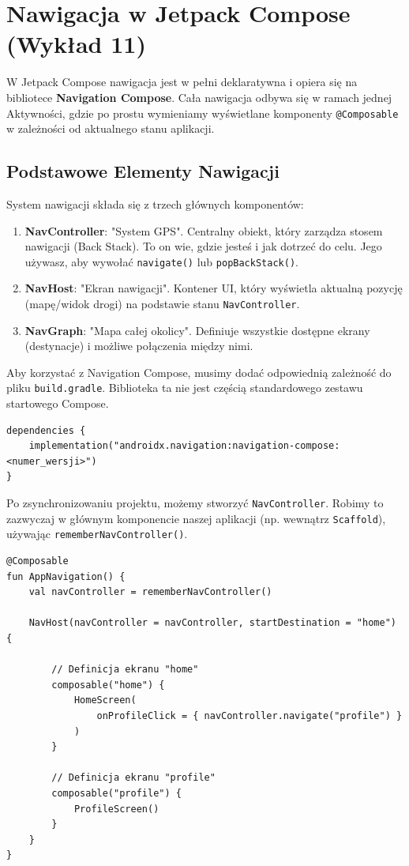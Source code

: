 \chapter{Nawigacja w Jetpack Compose (Wykład 11)}

W Jetpack Compose nawigacja jest w pełni deklaratywna i opiera się na bibliotece \textbf{Navigation Compose}. Cała nawigacja odbywa się w ramach jednej Aktywności, gdzie po prostu wymieniamy wyświetlane komponenty \texttt{@Composable} w zależności od aktualnego stanu aplikacji.

\section{Podstawowe Elementy Nawigacji}

System nawigacji składa się z trzech głównych komponentów:

\begin{enumerate}
    \item \textbf{NavController}: "System GPS". Centralny obiekt, który zarządza stosem nawigacji (Back Stack). To on wie, gdzie jesteś i jak dotrzeć do celu. Jego używasz, aby wywołać \texttt{navigate()} lub \texttt{popBackStack()}.
    \item \textbf{NavHost}: "Ekran nawigacji". Kontener UI, który wyświetla aktualną pozycję (mapę/widok drogi) na podstawie stanu \texttt{NavController}.
    \item \textbf{NavGraph}: "Mapa całej okolicy". Definiuje wszystkie dostępne ekrany (destynacje) i możliwe połączenia między nimi.
\end{enumerate}


Aby korzystać z Navigation Compose, musimy dodać odpowiednią zależność do pliku \texttt{build.gradle}. Biblioteka ta nie jest częścią standardowego zestawu startowego Compose.

\begin{verbatim}
dependencies {
    implementation("androidx.navigation:navigation-compose:<numer_wersji>")
}
\end{verbatim}

Po zsynchronizowaniu projektu, możemy stworzyć \texttt{NavController}. Robimy to zazwyczaj w głównym komponencie naszej aplikacji (np. wewnątrz \texttt{Scaffold}), używając \texttt{rememberNavController()}.

\begin{verbatim}
@Composable
fun AppNavigation() {
    val navController = rememberNavController()

    NavHost(navController = navController, startDestination = "home") {
        
        // Definicja ekranu "home"
        composable("home") {
            HomeScreen(
                onProfileClick = { navController.navigate("profile") }
            )
        }

        // Definicja ekranu "profile"
        composable("profile") {
            ProfileScreen()
        }
    }
}
\end{verbatim}


